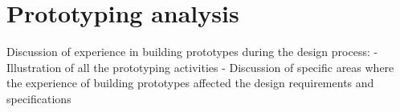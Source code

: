 \section{Prototyping analysis}
Discussion of experience in building prototypes during the design process:
- Illustration of all the prototyping activities
- Discussion of specific areas where the experience of building prototypes affected the design requirements and specifications